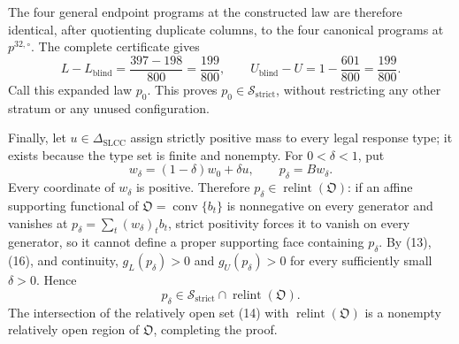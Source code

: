 The four general endpoint programs at the constructed law are therefore identical, after quotienting duplicate columns, to the four canonical programs at \(p^{32,\circ}\).  The complete certificate gives
\[
L-L_{\mathrm{blind}}=\frac{397-198}{800}=\frac{199}{800},
\qquad
U_{\mathrm{blind}}-U=1-\frac{601}{800}=\frac{199}{800}.
\tag{16}
\]
Call this expanded law \(p_0\).  This proves \(p_0\in\mathcal S_{\mathrm{strict}}\), without restricting any other stratum or any unused configuration.

Finally, let \(u\in\Delta_{\mathrm{SLCC}}\) assign strictly positive mass to every legal response type; it exists because the type set is finite and nonempty.  For \(0<\delta<1\), put
\[
w_\delta=(1-\delta)w_0+\delta u,
\qquad p_\delta=Bw_\delta.
\tag{17}
\]
Every coordinate of \(w_\delta\) is positive.  Therefore \(p_\delta\in\operatorname{relint}(\mathfrak O)\): if an affine supporting functional of \(\mathfrak O=\operatorname{conv}\{b_t\}\) is nonnegative on every generator and vanishes at \(p_\delta=\sum_t(w_\delta)_tb_t\), strict positivity forces it to vanish on every generator, so it cannot define a proper supporting face containing \(p_\delta\).  By (13), (16), and continuity, \(g_L(p_\delta)>0\) and \(g_U(p_\delta)>0\) for every sufficiently small \(\delta>0\).  Hence
\[
p_\delta\in\mathcal S_{\mathrm{strict}}\cap\operatorname{relint}(\mathfrak O).
\tag{18}
\]
The intersection of the relatively open set (14) with \(\operatorname{relint}(\mathfrak O)\) is a nonempty relatively open region of \(\mathfrak O\), completing the proof.